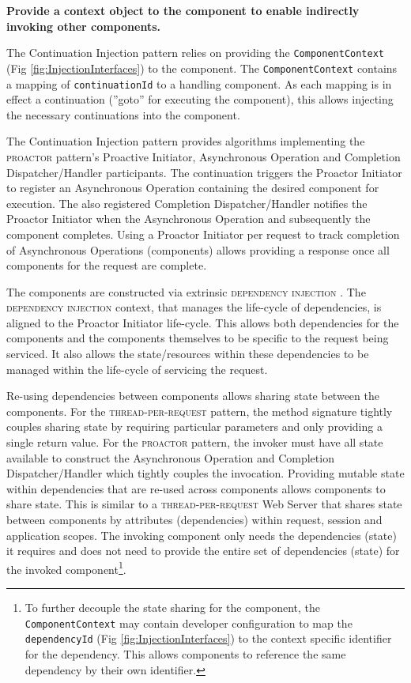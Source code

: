 \documentclass[prodmode]{style/acmlarge}
\begin{document}
\textbf{Provide a context object to the component to enable indirectly invoking other components.}

The Continuation Injection pattern relies on providing the
\texttt{ComponentContext} (Fig \ref{fig:InjectionInterfaces}) to the component.
The \texttt{ComponentContext} contains a mapping of \texttt{continuationId} to a
handling component.  As each mapping is in effect a continuation (''goto'' for
executing the component), this allows injecting the necessary continuations into
the component.

The Continuation Injection pattern provides algorithms implementing the
\textsc{proactor} pattern's Proactive Initiator, Asynchronous Operation and
Completion Dispatcher/Handler participants.  The continuation triggers the
Proactor Initiator to register an Asynchronous Operation containing the desired
component for execution.  The also registered Completion Dispatcher/Handler
notifies the Proactor Initiator when the Asynchronous Operation and subsequently
the component completes.  Using a Proactor Initiator per request to track
completion of Asynchronous Operations (components) allows providing a response
once all components for the request are complete.

The components are constructed via extrinsic \textsc{dependency injection}
\cite{ioc}. The \textsc{dependency injection} context, that manages the
life-cycle of dependencies, is aligned to the Proactor Initiator life-cycle.
This allows both dependencies for the components and the components themselves
to be specific to the request being serviced.  It also allows the
state/resources within these dependencies to be managed within the life-cycle of
servicing the request.

Re-using dependencies between components allows sharing state between the
components.  For the \textsc{thread-per-request} pattern, the method signature
tightly couples sharing state by requiring particular parameters and only
providing a single return value.  For the \textsc{proactor} pattern, the invoker
must have all state available to construct the Asynchronous Operation and
Completion Dispatcher/Handler which tightly couples the invocation.  Providing
mutable state within dependencies that are re-used across components allows
components to share state.  This is similar to a \textsc{thread-per-request} Web
Server that shares state between components by attributes (dependencies) within
request, session and application scopes.  The invoking component only needs the
dependencies (state) it requires and does not need to provide the entire set of
dependencies (state) for the invoked component\footnote{To further decouple the
state sharing for the component, the \texttt{ComponentContext} may contain
developer configuration to map the \texttt{dependencyId} (Fig
\ref{fig:InjectionInterfaces}) to the context specific identifier for the
dependency. This allows components to reference the same dependency by their own
identifier.}.
\end{document}
